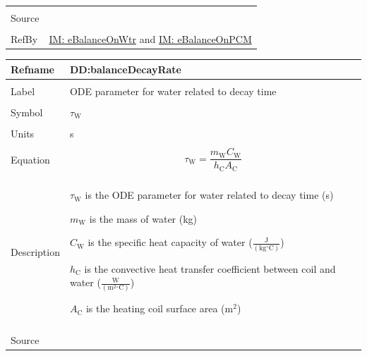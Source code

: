 \documentclass[12pt]{article}
\begin{document}
\begin{minipage}{\textwidth}
\begin{tabular}{>{\raggedright}p{}>{\raggedright\arraybackslash}p{}}
\\ \midrule \\
Source & \cite{koothoor2013}
         
\\ \midrule \\
RefBy & \hyperref[IM:eBalanceOnWtr]{IM: eBalanceOnWtr} and \hyperref[IM:eBalanceOnPCM]{IM: eBalanceOnPCM}
        
\\ \bottomrule
\end{tabular}
\end{minipage}

\vspace{\baselineskip}
\noindent
\begin{minipage}{\textwidth}
\begin{tabular}{>{\raggedright}p{}>{\raggedright\arraybackslash}p{}}
\toprule \textbf{Refname} & \textbf{DD:balanceDecayRate}
\label{DD:balanceDecayRate}
\\ \midrule \\
Label & ODE parameter for water related to decay time
        
\\ \midrule \\
Symbol & ${τ_{\text{W}}}$
         
\\ \midrule \\
Units & s
        
\\ \midrule \\
Equation & \begin{displaymath}
           {τ_{\text{W}}}=\frac{{m_{\text{W}}} {C_{\text{W}}}}{{h_{\text{C}}} {A_{\text{C}}}}
           \end{displaymath}
\\ \midrule \\
Description & \begin{symbDescription}
              \item{${τ_{\text{W}}}$ is the ODE parameter for water related to decay time (s)}
              \item{${m_{\text{W}}}$ is the mass of water (kg)}
              \item{${C_{\text{W}}}$ is the specific heat capacity of water ($\frac{\text{J}}{(\text{kg}{}^{\circ}\text{C})}$)}
              \item{${h_{\text{C}}}$ is the convective heat transfer coefficient between coil and water ($\frac{\text{W}}{(\text{m}^{2}{}^{\circ}\text{C})}$)}
              \item{${A_{\text{C}}}$ is the heating coil surface area ($\text{m}^{2}$)}
              \end{symbDescription}
\\ \midrule \\
Source & \cite{koothoor2013}
         

\end{tabular}
\end{minipage}
\end{document}
